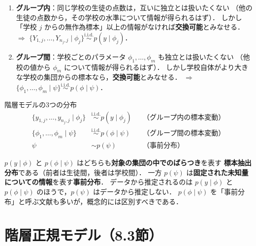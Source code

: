 \documentclass[lualatex,ja=standard,a4paper,12pt]{bxjsarticle}
\begin{document}
\begin{enumerate}
  \item \textbf{グループ内}：同じ学校の生徒の点数は，互いに独立とは扱いたくない
        （他の生徒の点数から，その学校の水準について情報が得られるはず）．
        しかし「学校 $j$ からの無作為標本」以上の情報がなければ\textbf{交換可能}とみなせる．
        $\Rightarrow$ $\{Y_{1,j}, \ldots, Y_{n_j,j} \mid \phi_j\} \overset{\text{i.i.d.}}{\sim} p(y \mid \phi_j)$．
  \item \textbf{グループ間}：学校ごとのパラメータ $\phi_1, \ldots, \phi_m$ も独立とは扱いたくない
        （他校の値から $\phi_m$ について情報が得られるはず）．
        しかし学校自体がより大きな学校の集団からの標本なら，\textbf{交換可能}とみなせる．
        $\Rightarrow$ $\{\phi_1, \ldots, \phi_m \mid \psi\} \overset{\text{i.i.d.}}{\sim} p(\phi \mid \psi)$．
\end{enumerate}

\begin{thmbox}{階層モデルの3つの分布}
\begin{align*}
  \{y_{1,j}, \ldots, y_{n_j,j} \mid \phi_j\} &\overset{\text{i.i.d.}}{\sim} p(y \mid \phi_j) && \text{（グループ内の標本変動）} \\
  \{\phi_1, \ldots, \phi_m \mid \psi\} &\overset{\text{i.i.d.}}{\sim} p(\phi \mid \psi) && \text{（グループ間の標本変動）} \\
  \psi &\sim p(\psi) && \text{（事前分布）}
\end{align*}
\end{thmbox}

\begin{warningbox}
$p(y \mid \phi)$ と $p(\phi \mid \psi)$ はどちらも\textbf{対象の集団の中でのばらつき}を表す
\textbf{標本抽出分布}である（前者は生徒間，後者は学校間）．
一方 $p(\psi)$ は\textbf{固定された未知量についての情報}を表す\textbf{事前分布}．
データから推定されるのは $p(y \mid \phi)$ と $p(\phi \mid \psi)$ のほうで，$p(\psi)$ はデータから推定しない．
$p(\phi \mid \psi)$ を「事前分布」と呼ぶ文献も多いが，概念的には区別すべきである．
\end{warningbox}

\section{階層正規モデル（8.3節）}
\end{document}
